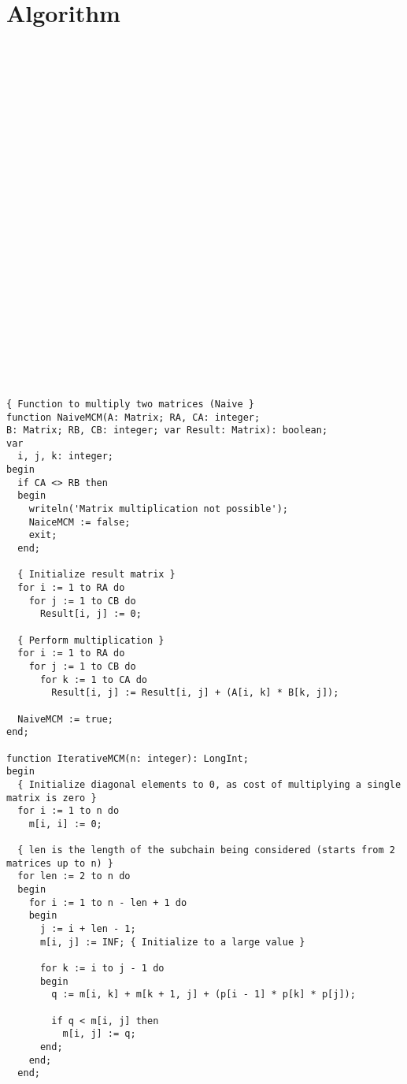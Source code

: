 \documentclass[conference]{IEEEtran}
\begin{document}
\section{Algorithm}
\begin{verbatim}



























{ Function to multiply two matrices (Naive }
function NaiveMCM(A: Matrix; RA, CA: integer; 
B: Matrix; RB, CB: integer; var Result: Matrix): boolean;
var
  i, j, k: integer;
begin
  if CA <> RB then
  begin
    writeln('Matrix multiplication not possible');
    NaiceMCM := false;
    exit;
  end;

  { Initialize result matrix }
  for i := 1 to RA do
    for j := 1 to CB do
      Result[i, j] := 0;

  { Perform multiplication }
  for i := 1 to RA do
    for j := 1 to CB do
      for k := 1 to CA do
        Result[i, j] := Result[i, j] + (A[i, k] * B[k, j]);

  NaiveMCM := true;
end;

function IterativeMCM(n: integer): LongInt;
begin
  { Initialize diagonal elements to 0, as cost of multiplying a single matrix is zero }
  for i := 1 to n do
    m[i, i] := 0;

  { len is the length of the subchain being considered (starts from 2 matrices up to n) }
  for len := 2 to n do
  begin
    for i := 1 to n - len + 1 do
    begin
      j := i + len - 1;
      m[i, j] := INF; { Initialize to a large value }

      for k := i to j - 1 do
      begin
        q := m[i, k] + m[k + 1, j] + (p[i - 1] * p[k] * p[j]);

        if q < m[i, j] then
          m[i, j] := q;
      end;
    end;
  end;


\end{verbatim}
\end{document}
